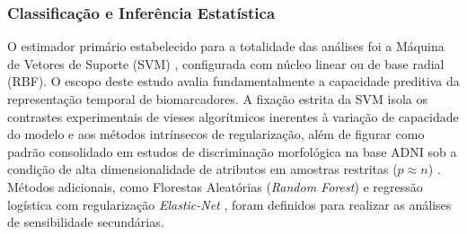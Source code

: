 \documentclass[review]{elsarticle}
\newcommand{\code}[1]{\texttt{#1}}
\begin{document}
\subsubsection{Classificação e Inferência Estatística}

O estimador primário estabelecido para a totalidade das análises foi a Máquina de Vetores de Suporte (SVM) \cite{cortes-1995}, configurada com núcleo linear ou de base radial (RBF). O escopo deste estudo avalia fundamentalmente a capacidade preditiva da representação temporal de biomarcadores. A fixação estrita da SVM isola os contrastes experimentais de vieses algorítmicos inerentes à variação de capacidade do modelo e aos métodos intrínsecos de regularização, além de figurar como padrão consolidado em estudos de discriminação morfológica na base ADNI sob a condição de alta dimensionalidade de atributos em amostras restritas ($p \approx n$) \cite{cuingnet-2011}. Métodos adicionais, como Florestas Aleatórias (\emph{Random Forest}) \cite{breiman-2001} e regressão logística com regularização \emph{Elastic-Net} \cite{zou-2005}, foram definidos para realizar as análises de sensibilidade secundárias. 


\end{document}
